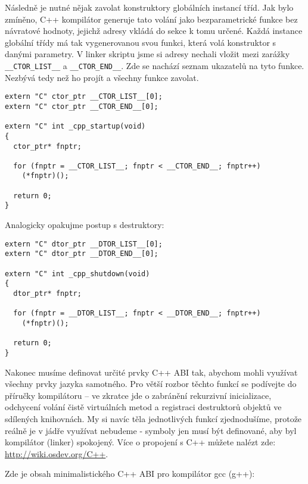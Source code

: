\documentclass{article}
\begin{document}
Následně je nutné nějak zavolat konstruktory globálních instancí tříd. Jak bylo zmíněno, C++ kompilátor generuje tato volání jako bezparametrické funkce bez návratové hodnoty, jejichž adresy vkládá do sekce k tomu určené. Každá instance globální třídy má tak vygenerovanou svou funkci, která volá konstruktor s danými parametry. V linker skriptu jsme si adresy nechali vložit mezi zarážky \texttt{\_\_CTOR\_LIST\_\_} a \texttt{\_\_CTOR\_END\_\_}. Zde se nachází seznam ukazatelů na tyto funkce. Nezbývá tedy než ho projít a všechny funkce zavolat.

\begin{lstlisting}
extern "C" ctor_ptr __CTOR_LIST__[0];
extern "C" ctor_ptr __CTOR_END__[0];

extern "C" int _cpp_startup(void)
{
  ctor_ptr* fnptr;

  for (fnptr = __CTOR_LIST__; fnptr < __CTOR_END__; fnptr++)
    (*fnptr)();
	
  return 0;
}
\end{lstlisting}

Analogicky opakujme postup s destruktory:

\begin{lstlisting}
extern "C" dtor_ptr __DTOR_LIST__[0];
extern "C" dtor_ptr __DTOR_END__[0];

extern "C" int _cpp_shutdown(void)
{
  dtor_ptr* fnptr;

  for (fnptr = __DTOR_LIST__; fnptr < __DTOR_END__; fnptr++)
    (*fnptr)();
	
  return 0;
}
\end{lstlisting}

Nakonec musíme definovat určité prvky C++ ABI tak, abychom mohli využívat všechny prvky jazyka samotného. Pro větší rozbor těchto funkcí se podívejte do příručky kompilátoru -- ve zkratce jde o zabránění rekurzivní inicializace, odchycení volání čistě virtuálních metod a registraci destruktorů objektů ve sdílených knihovnách. My si navíc těla jednotlivých funkcí zjednodušíme, protože reálně je v jádře využívat nebudeme - symboly jen musí být definované, aby byl kompilátor (linker) spokojený. Více o propojení s C++ můžete nalézt zde: \url{http://wiki.osdev.org/C++}.

Zde je obsah minimalistického C++ ABI pro kompilátor gcc (g++):
\end{document}

